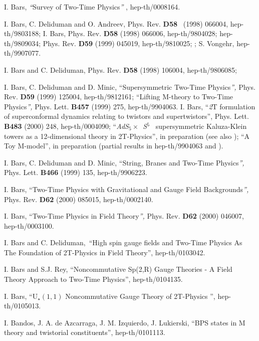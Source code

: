 \documentclass[a4paper,12pt]{article}
\begin{document}
\begin{thebibliography}{99}
  I. Bars, \textit{``}Survey of Two-Time Physics\textit{''}
, hep-th/0008164.

  I. Bars, C. Deliduman and O. Andreev, Phys. Rev. \textbf{D58%
} \ (1998) 066004, hep-th/9803188; I. Bars, Phys. Rev.
\textbf{D58} (1998) 066006, hep-th/9804028; hep-th/9809034; Phys.
Rev. \textbf{D59} (1999) 045019, hep-th/9810025; ; S. Vongehr,
hep-th/9907077.

  I. Bars and C. Deliduman, Phys. Rev. \textbf{D58} (1998)
106004, hep-th/9806085;

  I. Bars, C. Deliduman and D. Minic, ``Supersymmetric
Two-Time Physics\textit{'', }Phys. Rev. \textbf{D59} (1999)
125004, hep-th/9812161; ``Lifting M-theory to Two-Time
Physics\textit{'', }Phys. Lett. \textbf{B457} (1999) 275,
hep-th/9904063. \newline I. Bars, ``\textit{2}T formulation of
superconformal dynamics relating to twistors and supertwistors'',
Phys. Lett. \textbf{B483 }(2000) 248, hep-th/0004090;
``\textit{AdS}$_{5}\times $\textit{\ S}$^{5}$\textit{\ }
supersymmetric Kaluza-Klein towers as a 12-dimensional theory in
2T-Physics'', in preparation (see also \cite{survey2T}); ``A Toy
M-model'', in preparation (partial results in hep-th/9904063 and
\cite{survey2T}).

  I. Bars, C. Deliduman and D. Minic, ``String, Branes and
Two-Time Physics\textit{'', }Phys. Lett. \textbf{B466} (1999) 135,
hep-th/9906223.

  I. Bars, ``Two-Time Physics with Gravitational and Gauge
Field Backgrounds\textit{'', }Phys. Rev. \textbf{D62} (2000) 085015,
hep-th/0002140.

  I. Bars, ``Two-Time Physics in Field Theory\textit{'', }
Phys. Rev. \textbf{D62} (2000) 046007, hep-th/0003100.

  I. Bars and C. Deliduman,\ ``High spin gauge fields and
Two-Time Physics As The Foundation of 2T-Physics in Field Theory'',
hep-th/0103042.

  I. Bars and S.J. Rey, ``Noncommutative Sp(2,R) Gauge
Theories - A Field Theory Approach to Two-Time Physics'', hep-th/0104135.

  I. Bars, ``U$_{\star }\left( 1,1\right) $ Noncommutative
Gauge Theory of 2T-Physics '', hep-th/0105013.

  I. Bandos, J. A. de Azcarraga, J. M. Izquierdo, J.
Lukierski, ``BPS states in M theory and twistorial constituents'',
hep-th/0101113.


\end{thebibliography}
\end{document}
